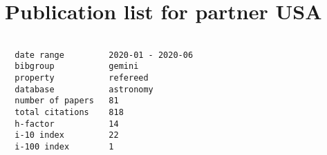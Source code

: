 \documentclass[twocolumn,linenumbers]{aastex63}
\begin{document}
\section*{Publication list for partner USA}

\begin{verbatim}

  date range         2020-01 - 2020-06
  bibgroup           gemini
  property           refereed
  database           astronomy
  number of papers   81
  total citations    818
  h-factor           14
  i-10 index         22
  i-100 index        1

\end{verbatim}

\vspace{4cm}

\nocite{*}


\end{document}
